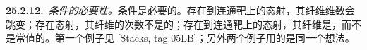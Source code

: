 \textbf{25.2.12.}\ \emph{\trFinitelyPresented{}条件的必要性。}\quad \trFinitelyPresented{}条件是必要的。存在到连通靶上的\trProjective\trFlat{}态射，其纤维维数会跳变；存在\trFinite\trFlat{}态射，其纤维的次数不是\trLocallyConstant{}的；存在到连通靶上的\trProjective\trFlat{}态射，其纤维是\trCurve，而\trArithmeticGenus{}不是常值的。第一个例子见 [Stacks, tag 05LB]；另外两个例子用的是同一个想法。

